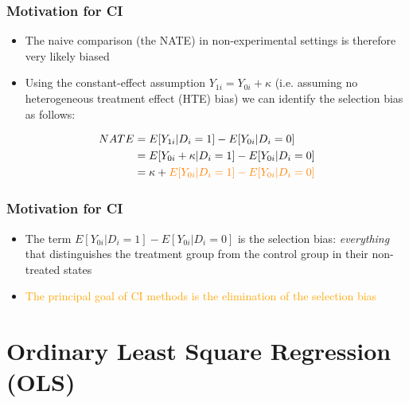 \documentclass[12pt,english,dvipsnames,aspectratio=169,handout]{beamer}\usepackage[]{graphicx}\usepackage[]{xcolor}
\begin{document}
\begin{frame}
	\frametitle{Motivation for CI}
	
	\begin{itemize}
		\item The naive comparison (the NATE) in non-experimental settings is therefore very likely biased
    \item Using the constant-effect assumption $Y_{1i}= Y_{0i} + \kappa$ (i.e. assuming no heterogeneous treatment effect (HTE) bias) we can identify the selection bias as follows:
	\end{itemize}
	\begin{equation}
  \begin{split}
  NATE 	& = E[Y_{1i}|D_i=1] - E[Y_{0i}|D_i=0]\\
		& = E[Y_{0i} + \kappa |D_i=1] - E[Y_{0i}|D_i=0]\\
		& = \kappa + \textcolor{orange}{{E[Y_{0i}|D_i=1] - E[Y_{0i}|D_i=0]}}\\
  \end{split}
\end{equation}

\end{frame}


\begin{frame}
	\frametitle{Motivation for CI}
	
	\begin{itemize}
		\setlength\itemsep{1.5em}
		\item The term $E[Y_{0i}|D_i=1] - E[Y_{0i}|D_i=0]$ is the selection bias: \emph{everything} that distinguishes the treatment group from the control group in their non-treated states
		\item \textcolor{orange}{The principal goal of CI methods is the elimination of the selection bias}
	\end{itemize}
	
\end{frame}




\section{Ordinary Least Square Regression (OLS)}
\end{document}

